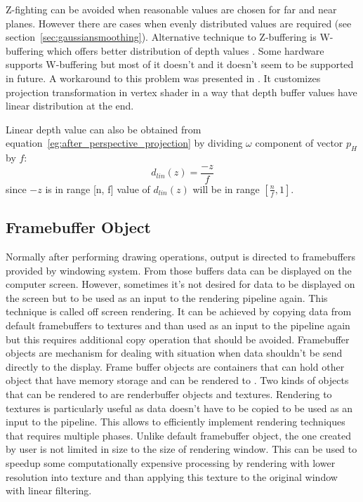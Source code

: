 Z-fighting can be avoided when reasonable values are chosen for far and near planes. However there are cases when evenly distributed values are required (see section~\ref{sec:gaussiansmoothing}). Alternative technique to Z-buffering is W-buffering which offers better distribution of depth values \cite{Gregory2009}. Some hardware supports W-buffering but most of it doesn't and it doesn't seem to be supported in future. A workaround to this problem was presented in \cite{Dunlop2006}. It customizes projection transformation in vertex shader in a way that depth buffer values have linear distribution at the end. 

Linear depth value can also be obtained from equation~\ref{eg:after_perspective_projection} by dividing $\omega$ component of vector $p_H$ by $f$:
\begin{equation}
\label{eq:linear_depth}
d_{lin}(z) = \frac{-z}{f}
\end{equation}
since $-z$ is in range [n, f] value of $d_{lin}(z)$ will be in range $[\frac{n}{f}, 1]$. 


\subsection{Framebuffer Object}
Normally after performing drawing operations, output is directed to framebuffers provided by windowing system. From those buffers data can be displayed on the computer screen. However, sometimes it's not desired for data to be displayed on the screen but to be used as an input to the rendering pipeline again. This technique is called off screen rendering. It can be achieved by copying data from default framebuffers to textures and than used as an input to the pipeline again but this requires additional copy operation that should be avoided. Framebuffer objects are mechanism for dealing with situation when data shouldn't be send directly to the display. Frame buffer objects are containers that can hold other object that have memory storage and can be rendered to \cite[chapter~8]{OpenGLSuperbible}. Two kinds of objects that can be rendered to are renderbuffer objects and textures. Rendering to textures is particularly useful as data doesn't have to be copied to be used as an input to the pipeline. This allows to efficiently implement rendering techniques that requires multiple phases.
Unlike default framebuffer object, the one created by user is not limited in size to the size of rendering window. This can be used to speedup some computationally expensive processing by rendering with lower resolution into texture and than applying this texture to the original window with linear filtering. 

